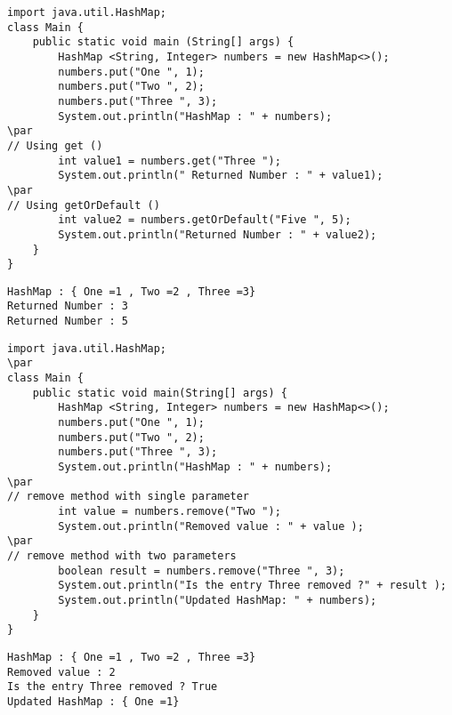 \documentclass{book}
\def\lthtmlcheckvsize{\ifdim\ht\sizebox<\vsize 
  \ifdim\wd\sizebox<\hsize\expandafter\hfill\fi \expandafter\vfill
  \else\expandafter\vss\fi}%
\begin{document}
{\newpage\clearpage
{}%
\begin{lstlisting}
import java.util.HashMap;
class Main {
	public static void main (String[] args) {
		HashMap <String, Integer> numbers = new HashMap<>();
		numbers.put("One ", 1);
		numbers.put("Two ", 2);
		numbers.put("Three ", 3);
		System.out.println("HashMap : " + numbers);
\par
// Using get ()
		int value1 = numbers.get("Three ");
		System.out.println(" Returned Number : " + value1);
\par
// Using getOrDefault ()
		int value2 = numbers.getOrDefault("Five ", 5);
		System.out.println("Returned Number : " + value2);
	}
}
\end{lstlisting}%
\lthtmlfigureZ
\lthtmlcheckvsize\clearpage}

{\newpage\clearpage
{}%
\begin{lstlisting}
HashMap : { One =1 , Two =2 , Three =3}
Returned Number : 3
Returned Number : 5
\end{lstlisting}%
\lthtmlfigureZ
\lthtmlcheckvsize\clearpage}

{\newpage\clearpage
{}%
\begin{lstlisting}
import java.util.HashMap;
\par
class Main {
	public static void main(String[] args) {
		HashMap <String, Integer> numbers = new HashMap<>();
		numbers.put("One ", 1);
		numbers.put("Two ", 2);
		numbers.put("Three ", 3);
		System.out.println("HashMap : " + numbers);
\par
// remove method with single parameter
		int value = numbers.remove("Two ");
		System.out.println("Removed value : " + value );
\par
// remove method with two parameters
		boolean result = numbers.remove("Three ", 3);
		System.out.println("Is the entry Three removed ?" + result );
		System.out.println("Updated HashMap: " + numbers);
	}
}
\end{lstlisting}%
\lthtmlfigureZ
\lthtmlcheckvsize\clearpage}

{\newpage\clearpage
{}%
\begin{lstlisting}
HashMap : { One =1 , Two =2 , Three =3}
Removed value : 2
Is the entry Three removed ? True
Updated HashMap : { One =1}
\end{lstlisting}%
\lthtmlfigureZ
\lthtmlcheckvsize\clearpage}
\end{document}
